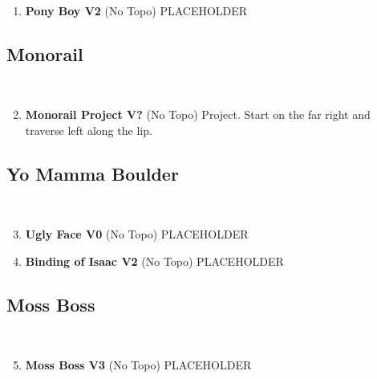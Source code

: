\begin{enumerate}[]
	\setcounter{enumi}{0}
	\item\label{rt:Pony Boy} \colorbox{green!20}{\textbf{Pony Boy V2  } }
	\newline (No Topo) 
	\newline PLACEHOLDER\
\end{enumerate}
\subsection*{Monorail}\label{bf:Monorail}
\

\begin{enumerate}[]
	\setcounter{enumi}{1}
	\item\label{rt:Monorail Project} \colorbox{black!20}{\textbf{Monorail Project V?  } }
	\newline (No Topo) 
	\newline Project. Start on the far right and traverse left along the lip.\
\end{enumerate}
\subsection*{Yo Mamma Boulder}\label{bf:Yo Mamma Boulder}
\

\begin{enumerate}[]
	\setcounter{enumi}{2}
	\item\label{rt:Ugly Face} \colorbox{green!20}{\textbf{Ugly Face V0   \warn } }
	\newline (No Topo) 
	\newline PLACEHOLDER\
	\setcounter{enumi}{3}
	\item\label{rt:Binding of Isaac} \colorbox{green!20}{\textbf{Binding of Isaac V2    \warn } }
	\newline (No Topo) 
	\newline PLACEHOLDER\
\end{enumerate}
\subsection*{Moss Boss}\label{bf:Moss Boss}
\

\begin{enumerate}[]
	\setcounter{enumi}{4}
	\item\label{rt:Moss Boss} \colorbox{green!20}{\textbf{Moss Boss V3   } }
	\newline (No Topo) 
	\newline PLACEHOLDER\
\end{enumerate}
